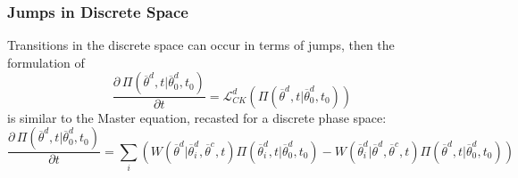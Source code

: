 %
%
%
%
\subsubsection{Jumps in Discrete Space}
\label{subsec:CKJumpsDiscrete}
Transitions in the discrete space can occur in terms of jumps, then the formulation of
\begin{equation}
\frac{\partial \, \Pi \left (\overline{\theta}^{d},t|\overline{\theta}^{d}_{0},t_{0}  \right ) }{\partial t} =
\mathcal{L}_{CK}^{d}\left ( \Pi \left (\overline{\theta}^{d},t|\overline{\theta}_{0}^{d},t_{0}
\right )  \right )
\end{equation}
is similar to the Master equation, recasted for a discrete phase space:
\begin{equation}
\frac{\partial \, \Pi \left (\overline{\theta}^{d},t|\overline{\theta}^{d}_{0},t_{0}  \right ) }{\partial t} =  \sum_{i} \left (  W\left ( \overline{\theta}^{d}|
\overline{\theta}^{d}_{i},\overline{\theta}^{c},t \right )\Pi \left (\overline{\theta}^{d}_{i},t|\overline{\theta}^{d}_{0},t_{0}
\right ) - W\left ( \overline{\theta}^{d}_{i}|
\overline{\theta}^{d},\overline{\theta}^{c},t \right )\Pi \left (\overline{\theta}^{d},t|\overline{\theta}_{0}^{d},t_{0}
\right )  \right )
\end{equation}

